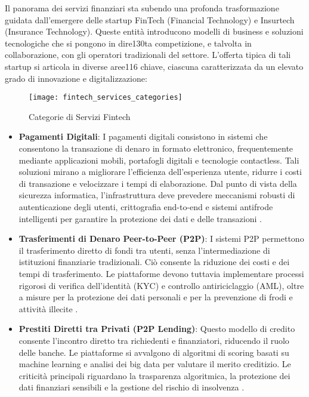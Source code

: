 Il panorama dei servizi finanziari sta subendo una profonda trasformazione guidata dall'emergere delle startup FinTech (Financial Technology) e Insurtech (Insurance Technology). Queste entità introducono modelli di business e soluzioni tecnologiche che si pongono in dire130ta competizione, e talvolta in collaborazione, con gli operatori tradizionali del settore. L'offerta tipica di tali startup si articola in diverse aree116 chiave, ciascuna caratterizzata da un elevato grado di innovazione e digitalizzazione:

\begin{figure}[h]
\centering
\texttt{[image: fintech\_services\_categories]}
\caption{Categorie di Servizi Fintech}
\label{fig:fintech_services}
\end{figure}

\begin{itemize}
    \item \textbf{Pagamenti Digitali}: I pagamenti digitali consistono in sistemi che consentono la transazione di denaro in formato elettronico, frequentemente mediante applicazioni mobili, portafogli digitali e tecnologie contactless. Tali soluzioni mirano a migliorare l'efficienza dell'esperienza utente, ridurre i costi di transazione e velocizzare i tempi di elaborazione. Dal punto di vista della sicurezza informatica, l'infrastruttura deve prevedere meccanismi robusti di autenticazione degli utenti, crittografia end-to-end e sistemi antifrode intelligenti per garantire la protezione dei dati e delle transazioni \cite{zhang2020digital}.
    
    \item \textbf{Trasferimenti di Denaro Peer-to-Peer (P2P)}: I sistemi P2P permettono il trasferimento diretto di fondi tra utenti, senza l'intermediazione di istituzioni finanziarie tradizionali. Ciò consente la riduzione dei costi e dei tempi di trasferimento. Le piattaforme devono tuttavia implementare processi rigorosi di verifica dell'identità (KYC) e controllo antiriciclaggio (AML), oltre a misure per la protezione dei dati personali e per la prevenzione di frodi e attività illecite \cite{zhang2020digital}.
    
    \item \textbf{Prestiti Diretti tra Privati (P2P Lending)}: Questo modello di credito consente l'incontro diretto tra richiedenti e finanziatori, riducendo il ruolo delle banche. Le piattaforme si avvalgono di algoritmi di scoring basati su machine learning e analisi dei big data per valutare il merito creditizio. Le criticità principali riguardano la trasparenza algoritmica, la protezione dei dati finanziari sensibili e la gestione del rischio di insolvenza \cite{milne2016p2p}.
    

\end{itemize}

